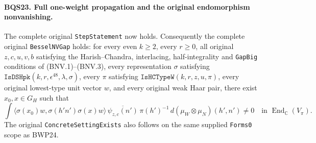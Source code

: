 \paragraph{BQS23. Full one-weight propagation and the original endomorphism nonvanishing.}
\label{claim:BQS23}
The complete original \texttt{StepStatement} now holds.
Consequently the complete original \texttt{BesselNVGap} holds:
for every even $k\ge2$, every $r\ge0$, all original
$z,c,u,v,b$ satisfying the Harish--Chandra, interlacing,
half-integrality and \texttt{GapBig} conditions of (BNV.1)--(BNV.3),
every representation $\sigma$ satisfying
$\texttt{IsDSHpk}(k,r,\epsilon^{48},\lambda,\sigma)$,
every $\pi$ satisfying $\texttt{IsHCTypeW}(k,r,z,u,\pi)$,
every original lowest-type unit vector $w$, and every original
weak Haar pair, there exist $x_0,x\in G_H$ such that
\[
 \int
 \langle\sigma(x_0)w,\sigma(h'n')\sigma(x)w\rangle\,
    \overline{\psi_{z,c}(n')}\,\pi(h')^{-1}\,
                  d(\mu_W\otimes\mu_N)(h',n')\ne0
       \quad\text{in }\operatorname{End}_{\mathbb C}(V_\pi).
 \tag{BQS.68}
\]
The original \texttt{ConcreteSettingExists} also follows on the
same supplied \texttt{Forms0} scope as BWP24.


